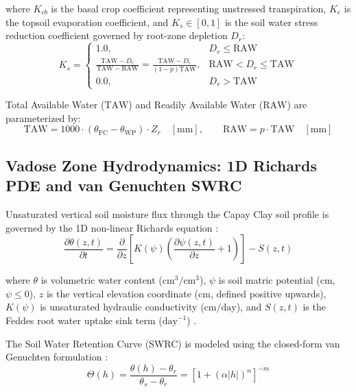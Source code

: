 \documentclass[sn-mathphys-num,Numbered]{sn-jnl}
\begin{document}
where $K_{cb}$ is the basal crop coefficient representing unstressed transpiration, $K_e$ is the topsoil evaporation coefficient, and $K_s \in [0, 1]$ is the soil water stress reduction coefficient governed by root-zone depletion $D_r$:
\begin{equation}
K_s = \begin{cases} 
1.0, & D_r \le \mathrm{RAW} \\
\frac{\mathrm{TAW} - D_r}{\mathrm{TAW} - \mathrm{RAW}} = \frac{\mathrm{TAW} - D_r}{(1 - p)\mathrm{TAW}}, & \mathrm{RAW} < D_r \le \mathrm{TAW} \\
0.0, & D_r > \mathrm{TAW}
\end{cases} \label{eq:ks_formulation}
\end{equation}

Total Available Water ($\mathrm{TAW}$) and Readily Available Water ($\mathrm{RAW}$) are parameterized by:
\begin{equation}
\mathrm{TAW} = 1000 \cdot (\theta_{\text{FC}} - \theta_{\text{WP}}) \cdot Z_r \quad [\text{mm}], \qquad \mathrm{RAW} = p \cdot \mathrm{TAW} \quad [\text{mm}] \label{eq:taw_raw}
\end{equation}

\subsection{Vadose Zone Hydrodynamics: 1D Richards PDE and van Genuchten SWRC}\label{sec:methods_richards}
Unsaturated vertical soil moisture flux through the Capay Clay soil profile is governed by the 1D non-linear Richards equation \cite{Richards1931}:
\begin{equation}
\frac{\partial \theta(z, t)}{\partial t} = \frac{\partial}{\partial z} \left[ K(\psi) \left( \frac{\partial \psi(z, t)}{\partial z} + 1 \right) \right] - S(z, t) \label{eq:richards}
\end{equation}

where $\theta$ is volumetric water content ($\text{cm}^3/\text{cm}^3$), $\psi$ is soil matric potential ($\text{cm}$, $\psi \le 0$), $z$ is the vertical elevation coordinate ($\text{cm}$, defined positive upwards), $K(\psi)$ is unsaturated hydraulic conductivity ($\text{cm/day}$), and $S(z, t)$ is the Feddes root water uptake sink term ($\text{day}^{-1}$) \cite{vanGenuchten1980,Kool2014}.

The Soil Water Retention Curve (SWRC) is modeled using the closed-form van Genuchten formulation \cite{vanGenuchten1980}:
\begin{equation}
\Theta(h) = \frac{\theta(h) - \theta_r}{\theta_s - \theta_r} = \left[ 1 + (\alpha |h|)^n \right]^{-m} \label{eq:van_genuchten_theta}
\end{equation}
\end{document}
